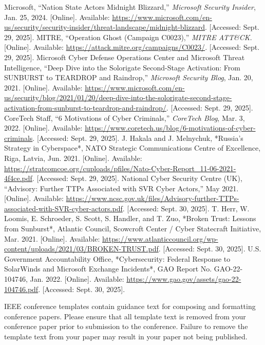 \documentclass[conference]{IEEEtran}
\begin{document}
\begin{thebibliography}{}
 Microsoft, ``Nation State Actors Midnight Blizzard,'' \emph{Microsoft Security Insider}, Jan. 25, 2024. [Online]. Available: \url{https://www.microsoft.com/en-us/security/security-insider/threat-landscape/midnight-blizzard}. [Accessed: Sept. 29, 2025].
 MITRE, ``Operation Ghost (Campaign C0023),'' \emph{MITRE ATT\&CK}. [Online]. Available: \url{https://attack.mitre.org/campaigns/C0023/}. [Accessed: Sept. 29, 2025].
 Microsoft Cyber Defense Operations Center and Microsoft Threat Intelligence, ``Deep Dive into the Solorigate Second-Stage Activation: From SUNBURST to TEARDROP and Raindrop,'' \emph{Microsoft Security Blog}, Jan. 20, 2021. [Online]. Available: \url{https://www.microsoft.com/en-us/security/blog/2021/01/20/deep-dive-into-the-solorigate-second-stage-activation-from-sunburst-to-teardrop-and-raindrop/}. [Accessed: Sept. 29, 2025].
 CoreTech Staff, ``6 Motivations of Cyber Criminals,'' \emph{CoreTech Blog}, Mar. 3, 2022. [Online]. Available: \url{https://www.coretech.us/blog/6-motivations-of-cyber-criminals}. [Accessed: Sept. 29, 2025].
 J. Hakala and J. Melnychuk, *Russia’s Strategy in Cyberspace*, NATO Strategic Communications Centre of Excellence, Riga, Latvia, Jun. 2021. [Online]. Available: \url{https://stratcomcoe.org/cuploads/pfiles/Nato-Cyber-Report_11-06-2021-4f4ce.pdf}. [Accessed: Sept. 29, 2025].
 National Cyber Security Centre (UK), ``Advisory: Further TTPs Associated with SVR Cyber Actors,'' May 2021. [Online]. Available: \url{https://www.ncsc.gov.uk/files/Advisory-further-TTPs-associated-with-SVR-cyber-actors.pdf}. [Accessed: Sept. 30, 2025].
 T. Herr, W. Loomis, E. Schroeder, S. Scott, S. Handler, and T. Zuo, *Broken Trust: Lessons from Sunburst*, Atlantic Council, Scowcroft Center / Cyber Statecraft Initiative, Mar. 2021. [Online]. Available: \url{https://www.atlanticcouncil.org/wp-content/uploads/2021/03/BROKEN-TRUST.pdf}. [Accessed: Sept. 30, 2025].
 U.S. Government Accountability Office, *Cybersecurity: Federal Response to SolarWinds and Microsoft Exchange Incidents*, GAO Report No. GAO-22-104746, Jan. 2022. [Online]. Available: \url{https://www.gao.gov/assets/gao-22-104746.pdf}. [Accessed: Sept. 30, 2025].
\end{thebibliography}
\vspace{12pt}
\color{red}
IEEE conference templates contain guidance text for composing and formatting conference papers. Please ensure that all template text is removed from your conference paper prior to submission to the conference. Failure to remove the template text from your paper may result in your paper not being published.
\end{document}
